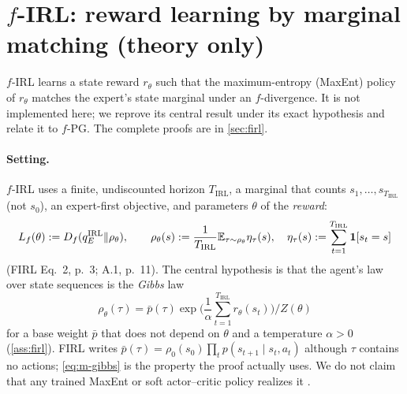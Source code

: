 \section{\texorpdfstring{$f$}{f}-IRL: reward learning by marginal matching (theory only)}\label{sec:m-firl}

$f$-IRL \citep{ni2021firl} learns a state reward $r_\theta$ such that the maximum-entropy (MaxEnt) policy of $r_\theta$ matches the expert's state marginal under an $f$-divergence.
It is not implemented here; we reprove its central result under its exact hypothesis and relate it to $f$-PG. The complete proofs are in \cref{sec:firl}.

\paragraph{Setting.}
$f$-IRL uses a finite, undiscounted horizon $T_{\mathrm{IRL}}$, a marginal that counts $s_1,\dots,s_{T_{\mathrm{IRL}}}$ (not $s_0$), an expert-first objective, and parameters $\theta$ of the \emph{reward}:
\[
L_f(\theta):=D_f(q^{\mathrm{IRL}}_E\Vert\rho_\theta),\qquad\rho_\theta(s):=\frac1{T_{\mathrm{IRL}}}\mathbb{E}_{\tau\sim\rho_\theta}\eta_\tau(s),\quad\eta_\tau(s):=\sum_{t=1}^{T_{\mathrm{IRL}}}\mathbf{1}[s_t=s]
\]
(FIRL Eq.~2, p.~3; A.1, p.~11). The central hypothesis is that the agent's law over state sequences is the \emph{Gibbs} law
\begin{equation}\label{eq:m-gibbs}
\rho_\theta(\tau)=\bar p(\tau)\exp\Big(\frac1\alpha\sum_{t=1}^{T_{\mathrm{IRL}}}r_\theta(s_t)\Big)\Big/Z(\theta)
\end{equation}
for a base weight $\bar p$ that does not depend on $\theta$ and a temperature $\alpha>0$ (\cref{ass:firl}). FIRL writes $\bar p(\tau)=\rho_0(s_0)\prod_tp(s_{t+1}\mid s_t,a_t)$ although $\tau$ contains no actions; \eqref{eq:m-gibbs} is the property the proof actually uses. We do not claim that any trained MaxEnt or soft actor--critic policy realizes it .

